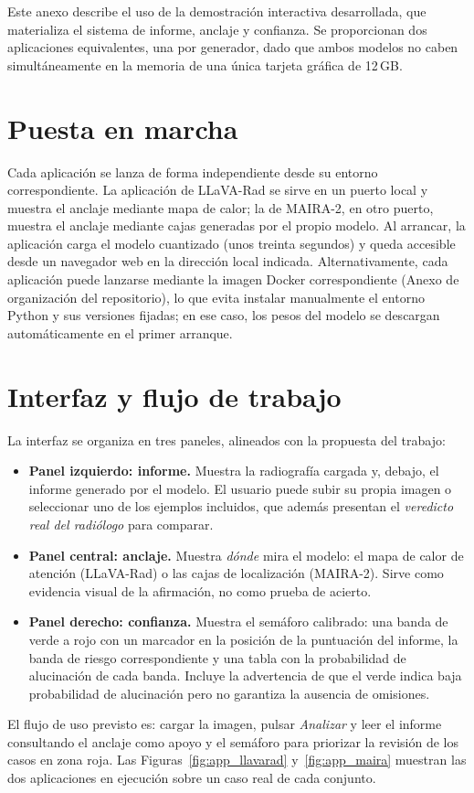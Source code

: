 \documentclass[12pt,a4paper]{report}
\begin{document}
Este anexo describe el uso de la demostración interactiva desarrollada, que materializa el sistema de
informe, anclaje y confianza. Se proporcionan dos aplicaciones equivalentes, una por generador, dado
que ambos modelos no caben simultáneamente en la memoria de una única tarjeta gráfica de 12\,GB.

\section{Puesta en marcha}
Cada aplicación se lanza de forma independiente desde su entorno correspondiente. La aplicación de
LLaVA-Rad se sirve en un puerto local y muestra el anclaje mediante mapa de calor; la de
MAIRA-2, en otro puerto, muestra el anclaje mediante cajas generadas por el propio modelo.
Al arrancar, la aplicación carga el modelo cuantizado (unos treinta segundos) y queda accesible desde
un navegador web en la dirección local indicada. Alternativamente, cada aplicación puede lanzarse
mediante la imagen Docker correspondiente (Anexo de organización del repositorio), lo que
evita instalar manualmente el entorno Python y sus versiones fijadas; en ese caso, los pesos del
modelo se descargan automáticamente en el primer arranque.

\section{Interfaz y flujo de trabajo}
La interfaz se organiza en tres paneles, alineados con la propuesta del trabajo:
\begin{itemize}
  \item \textbf{Panel izquierdo: informe.} Muestra la radiografía cargada y, debajo, el informe
  generado por el modelo. El usuario puede subir su propia imagen o seleccionar uno de los ejemplos
  incluidos, que además presentan el \emph{veredicto real del radiólogo} para comparar.
  \item \textbf{Panel central: anclaje.} Muestra \emph{dónde} mira el modelo: el mapa de calor de
  atención (LLaVA-Rad) o las cajas de localización (MAIRA-2). Sirve como evidencia visual de la
  afirmación, no como prueba de acierto.
  \item \textbf{Panel derecho: confianza.} Muestra el semáforo calibrado: una banda de
  verde a rojo con un marcador en la posición de la puntuación del informe, la banda de riesgo
  correspondiente y una tabla con la probabilidad de alucinación de cada banda. Incluye la advertencia
  de que el verde indica baja probabilidad de alucinación pero no garantiza la ausencia de omisiones.
\end{itemize}
El flujo de uso previsto es: cargar la imagen, pulsar \emph{Analizar} y leer el informe consultando el
anclaje como apoyo y el semáforo para priorizar la revisión de los casos en zona roja. Las
Figuras~\ref{fig:app_llavarad} y~\ref{fig:app_maira} muestran las dos aplicaciones en ejecución sobre
un caso real de cada conjunto.
\end{document}
